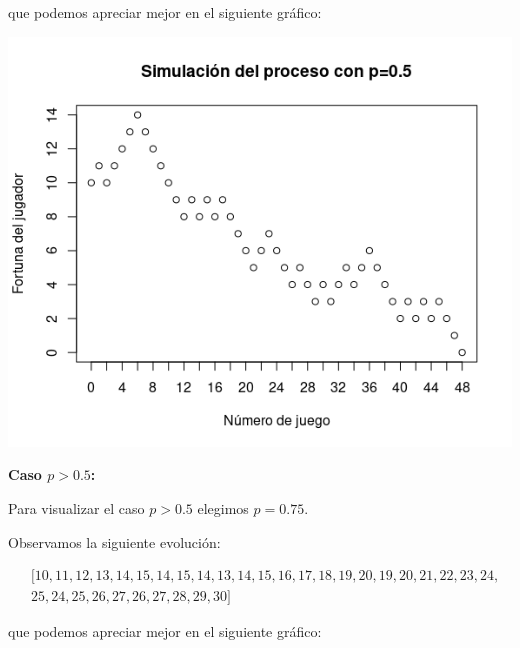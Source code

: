 \documentclass[11pt]{article}
\begin{document}
\vspace{-0.5cm}

que podemos apreciar mejor en el siguiente gráfico: 

\begin{center}\includegraphics[scale = 0.55]{P3Sim2.png}\end{center}

\textbf{Caso $p > 0.5$:}

Para visualizar el caso $p > 0.5$ elegimos $p=0.75$. 

Observamos la siguiente evolución: 

\vspace{-1cm}

\begin{align*}
    & [10, 11, 12, 13, 14, 15, 14, 15, 14, 13, 14, 15, 16, 17, 18, 19, 20, 19, 20, 21, 22, 23, 24, \\ 
    & 25, 24, 25, 26, 27, 26, 27, 28, 29, 30]
\end{align*}

\vspace{-0.5cm}

que podemos apreciar mejor en el siguiente gráfico: 
\end{document}

